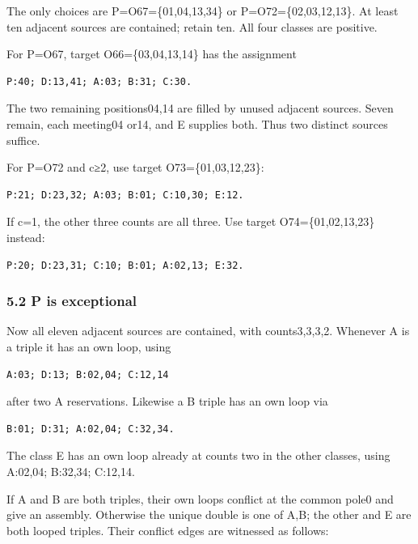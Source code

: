\documentclass[
  10pt,
]{article}
\begin{document}
The only choices are P=O67=\{01,04,13,34\} or P=O72=\{02,03,12,13\}. At
least ten adjacent sources are contained; retain ten. All four classes
are positive.

For P=O67, target O66=\{03,04,13,14\} has the assignment

\begin{verbatim}
P:40; D:13,41; A:03; B:31; C:30.
\end{verbatim}

The two remaining positions04,14 are filled by unused adjacent sources.
Seven remain, each meeting04 or14, and E supplies both. Thus two
distinct sources suffice.

For P=O72 and c≥2, use target O73=\{01,03,12,23\}:

\begin{verbatim}
P:21; D:23,32; A:03; B:01; C:10,30; E:12.
\end{verbatim}

If c=1, the other three counts are all three. Use target
O74=\{01,02,13,23\} instead:

\begin{verbatim}
P:20; D:23,31; C:10; B:01; A:02,13; E:32.
\end{verbatim}

\hypertarget{p-is-exceptional}{%
\subsubsection*{5.2 P is exceptional}\label{p-is-exceptional}}

Now all eleven adjacent sources are contained, with counts3,3,3,2.
Whenever A is a triple it has an own loop, using

\begin{verbatim}
A:03; D:13; B:02,04; C:12,14
\end{verbatim}

after two A reservations. Likewise a B triple has an own loop via

\begin{verbatim}
B:01; D:31; A:02,04; C:32,34.
\end{verbatim}

The class E has an own loop already at counts two in the other classes,
using A:02,04; B:32,34; C:12,14.

If A and B are both triples, their own loops conflict at the common
pole0 and give an assembly. Otherwise the unique double is one of A,B;
the other and E are both looped triples. Their conflict edges are
witnessed as follows:
\end{document}
